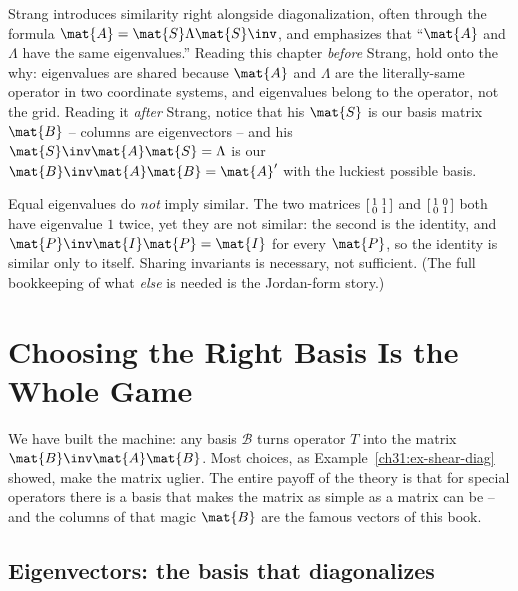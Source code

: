 \begin{strangbox}
Strang introduces similarity right alongside diagonalization, often through the
formula $\mat{A}=\mat{S}\Lambda\mat{S}\inv$, and emphasizes that ``$\mat{A}$ and
$\Lambda$ have the same eigenvalues.'' Reading this chapter \emph{before} Strang,
hold onto the why: eigenvalues are shared because $\mat{A}$ and $\Lambda$ are the
literally-same operator in two coordinate systems, and eigenvalues belong to the
operator, not the grid. Reading it \emph{after} Strang, notice that his $\mat{S}$
is our basis matrix $\mat{B}$ -- columns are eigenvectors -- and his
$\mat{S}\inv\mat{A}\mat{S}=\Lambda$ is our $\mat{B}\inv\mat{A}\mat{B}=\mat{A}'$
with the luckiest possible basis.
\end{strangbox}

\begin{trapbox}
Equal eigenvalues do \emph{not} imply similar. The two matrices
$\begin{bsmallmatrix}1&1\\0&1\end{bsmallmatrix}$ and
$\begin{bsmallmatrix}1&0\\0&1\end{bsmallmatrix}$ both have eigenvalue $1$ twice,
yet they are not similar: the second is the identity, and $\mat{P}\inv\mat{I}\mat{P}=\mat{I}$
for every $\mat{P}$, so the identity is similar only to itself. Sharing invariants
is necessary, not sufficient. (The full bookkeeping of what \emph{else} is needed
is the Jordan-form story.)
\end{trapbox}

\section{Choosing the Right Basis Is the Whole Game}
\label{ch31:right-basis}

We have built the machine: any basis $\mathcal{B}$ turns operator $T$ into the
matrix $\mat{B}\inv\mat{A}\mat{B}$. Most choices, as Example~\ref{ch31:ex-shear-diag}
showed, make the matrix uglier. The entire payoff of the theory is that for
special operators there is a basis that makes the matrix as simple as a matrix can
be -- and the columns of that magic $\mat{B}$ are the famous vectors of this book.

\subsection{Eigenvectors: the basis that diagonalizes}
\label{ch31:eigenbasis}

